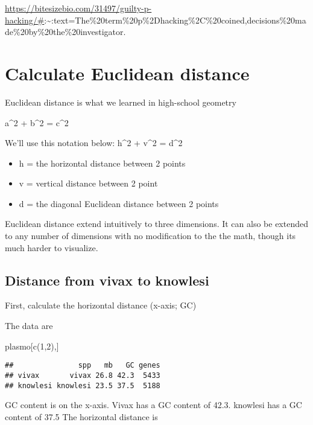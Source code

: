 \documentclass[
]{book}
\newenvironment{Shaded}{\begin{snugshade}}{\end{snugshade}}
\newcommand{\DecValTok}[1]{\textcolor[rgb]{0.00,0.00,0.81}{#1}}
\newcommand{\FunctionTok}[1]{\textcolor[rgb]{0.00,0.00,0.00}{#1}}
\newcommand{\NormalTok}[1]{#1}
\providecommand{\tightlist}{%
  \setlength{\itemsep}{0pt}\setlength{\parskip}{0pt}}
\begin{document}
\url{https://bitesizebio.com/31497/guilty-p-hacking/\#}:\textasciitilde:text=The\%20term\%20p\%2Dhacking\%2C\%20coined,decisions\%20made\%20by\%20the\%20investigator.

\hypertarget{calculate-euclidean-distance}{%
\section{Calculate Euclidean distance}\label{calculate-euclidean-distance}}

Euclidean distance is what we learned in high-school geometry

a\^{}2 + b\^{}2 = c\^{}2

We'll use this notation below:
h\^{}2 + v\^{}2 = d\^{}2

\begin{itemize}
\tightlist
\item
  h = the horizontal distance between 2 points
\item
  v = vertical distance between 2 point
\item
  d = the diagonal Euclidean distance between 2 points
\end{itemize}

Euclidean distance extend intuitively to three dimensions. It can also be extended to any number of dimensions with no modification to the the math, though its much harder to visualize.

\hypertarget{distance-from-vivax-to-knowlesi}{%
\subsection{Distance from vivax to knowlesi}\label{distance-from-vivax-to-knowlesi}}

First, calculate the horizontal distance (x-axis; GC)

The data are

\begin{Shaded}
\begin{Highlighting}[]
\NormalTok{plasmo[}\FunctionTok{c}\NormalTok{(}\DecValTok{1}\NormalTok{,}\DecValTok{2}\NormalTok{),]}
\end{Highlighting}
\end{Shaded}

\begin{verbatim}
##               spp   mb   GC genes
## vivax       vivax 26.8 42.3  5433
## knowlesi knowlesi 23.5 37.5  5188
\end{verbatim}

GC content is on the x-axis. Vivax has a GC content of 42.3. knowlesi has a GC content of 37.5 The horizontal distance is
\end{document}
